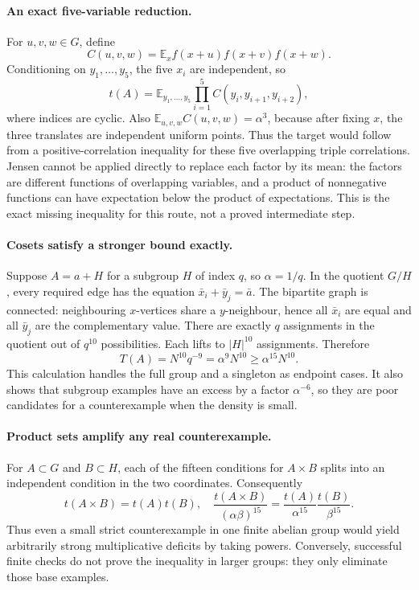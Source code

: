 \documentclass[11pt,a4paper]{article}
\newcommand{\E}{\mathbb{E}}
\begin{document}
\paragraph{An exact five-variable reduction.}
For $u,v,w\in G$, define
\[
 C(u,v,w)=\E_x f(x+u)f(x+v)f(x+w).
\]
Conditioning on $y_1,\ldots,y_5$, the five $x_i$ are independent, so
\[
 t(A)=\E_{y_1,\ldots,y_5}\prod_{i=1}^5
 C(y_i,y_{i+1},y_{i+2}),
\]
where indices are cyclic. Also $\E_{u,v,w}C(u,v,w)=\alpha^3$, because after fixing $x$, the three translates are independent uniform points. Thus the target would follow from a positive-correlation inequality for these five overlapping triple correlations. Jensen cannot be applied directly to replace each factor by its mean: the factors are different functions of overlapping variables, and a product of nonnegative functions can have expectation below the product of expectations. This is the exact missing inequality for this route, not a proved intermediate step.

\paragraph{Cosets satisfy a stronger bound exactly.}
Suppose $A=a+H$ for a subgroup $H$ of index $q$, so $\alpha=1/q$. In the quotient $G/H$, every required edge has the equation $\bar x_i+\bar y_j=\bar a$. The bipartite graph is connected: neighbouring $x$-vertices share a $y$-neighbour, hence all $\bar x_i$ are equal and all $\bar y_j$ are the complementary value. There are exactly $q$ assignments in the quotient out of $q^{10}$ possibilities. Each lifts to $|H|^{10}$ assignments. Therefore
\[
 T(A)=N^{10}q^{-9}=\alpha^9N^{10}\geq\alpha^{15}N^{10}.
\]
This calculation handles the full group and a singleton as endpoint cases. It also shows that subgroup examples have an excess by a factor $\alpha^{-6}$, so they are poor candidates for a counterexample when the density is small.

\paragraph{Product sets amplify any real counterexample.}
For $A\subset G$ and $B\subset H$, each of the fifteen conditions for $A\times B$ splits into an independent condition in the two coordinates. Consequently
\[
 t(A\times B)=t(A)t(B),\quad
 \frac{t(A\times B)}{(\alpha\beta)^{15}}
 =\frac{t(A)}{\alpha^{15}}\frac{t(B)}{\beta^{15}}.
\]
Thus even a small strict counterexample in one finite abelian group would yield arbitrarily strong multiplicative deficits by taking powers. Conversely, successful finite checks do not prove the inequality in larger groups: they only eliminate those base examples.
\end{document}
